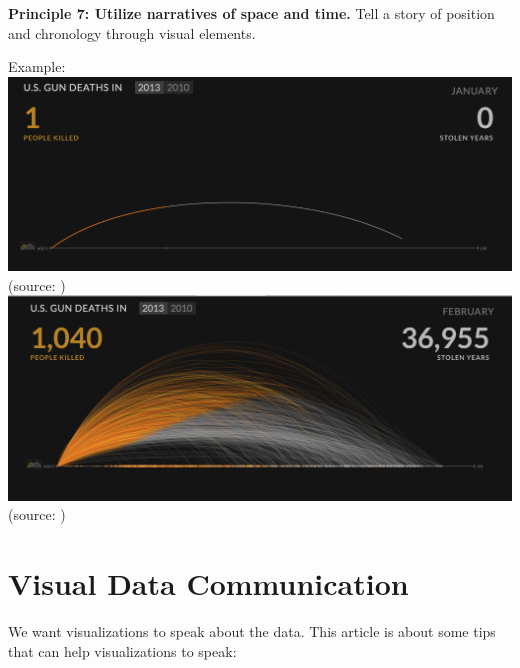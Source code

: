 \documentclass[]{book}
\theoremstyle{definition}
\theoremstyle{definition}
\theoremstyle{definition}
\theoremstyle{remark}
\begin{document}
\textbf{Principle 7: Utilize narratives of space and time.} Tell a story
of position and chronology through visual elements.

Example: \includegraphics{images/Tufte_figure11.png} (source:
\citep{narratives_2017}) \includegraphics{images/Tufte_figure12.png}
(source: \citep{narratives_2017})

\section{Visual Data Communication}\label{visual-data-communication}

We want visualizations to speak about the data. This article is about
some tips that can help visualizations to speak:
\end{document}
